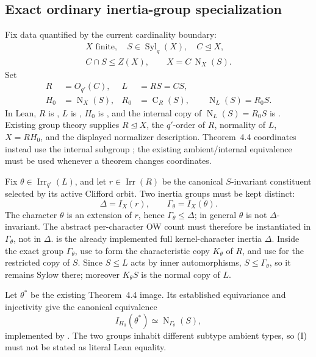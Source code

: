 \documentclass[11pt]{article}
\newcommand{\Irr}{\operatorname{Irr}}
\newcommand{\Norm}{\operatorname{N}}
\newcommand{\Cent}{\operatorname{C}}
\newcommand{\Syl}{\operatorname{Syl}}
\begin{document}
\subsection{Exact ordinary inertia-group specialization}

Fix data quantified by the current cardinality boundary:
\[
\begin{gathered}
X\text{ finite},\quad S\in\Syl_q(X),\quad C\trianglelefteq X,\\
C\cap S\leq Z(X),\qquad X=C\,\Norm_X(S).
\end{gathered}
\]
Set
\[
\begin{aligned}
R&=O_{q'}(C),&
L&=RS=CS,\\
H_0&=\Norm_X(S),&
R_0&=\Cent_R(S),\qquad \Norm_L(S)=R_0S.
\end{aligned}
\]
In Lean, \(R\) is
,
\(L\) is , \(H_0\) is
, and the internal copy of
\(\Norm_L(S)=R_0S\) is .
Existing group theory supplies \(R\trianglelefteq X\), the \(q'\)-order of
\(R\), normality of \(L\), \(X=RH_0\), and the displayed normalizer
description.  Theorem~4.4 coordinates instead use the internal subgroup
; the existing ambient/internal equivalence
must be used whenever a theorem changes coordinates.

Fix \(\theta\in\Irr_{q'}(L)\), and let
\(r\in\Irr(R)\) be the canonical \(S\)-invariant constituent selected by
its active Clifford orbit.  Two inertia groups must be kept distinct:
\[
  \Delta=I_X(r),\qquad \Gamma_\theta=I_X(\theta).
\]
The character \(\theta\) is an extension of \(r\), hence
\(\Gamma_\theta\leq\Delta\); in general \(\theta\) is not
\(\Delta\)-invariant.  The abstract per-character OW count must therefore
be instantiated in \(\Gamma_\theta\), not in \(\Delta\).
 is the already implemented full
kernel-character inertia \(\Delta\).  Inside the exact group
\(\Gamma_\theta\), use
 to form the characteristic copy \(K_\theta\)
of \(R\), and use
 for the restricted copy
of \(S\).  Since \(S\leq L\) acts by inner automorphisms,
\(S\leq\Gamma_\theta\), so it remains Sylow there; moreover
\(K_\theta S\) is the normal copy of \(L\).

Let \(\theta^*\) be the existing Theorem~4.4 image.  Its established
equivariance and injectivity give the canonical equivalence
\[
 I_{H_0}(\theta^*)\simeq\Norm_{\Gamma_\theta}(S),
\tag{I}
\]
implemented by
.
The two groups inhabit different subtype ambient types, so (I) must not be
stated as literal Lean equality.
\end{document}
